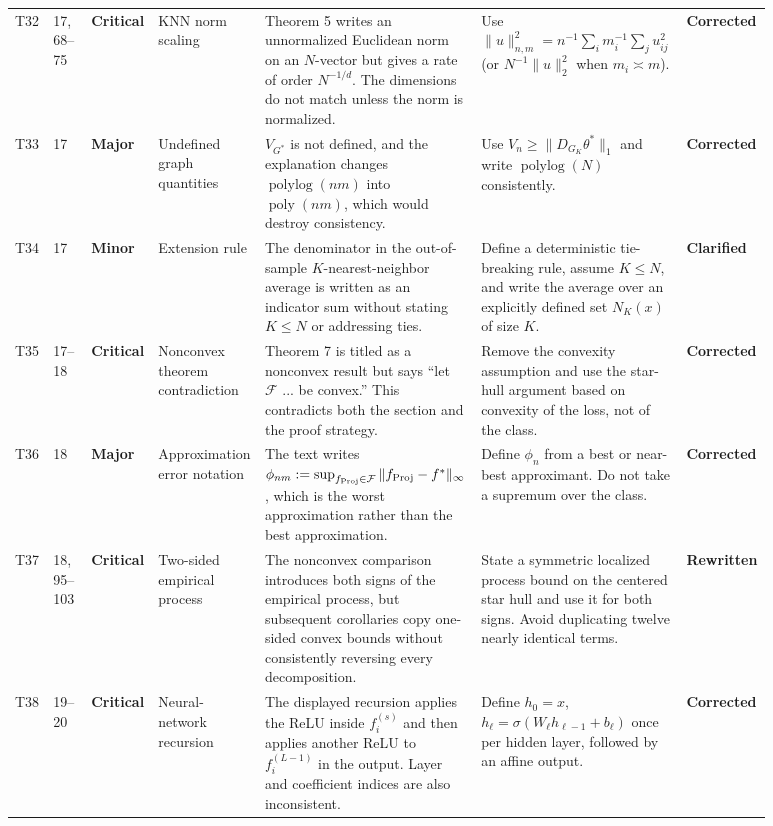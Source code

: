 \documentclass[11pt]{article}
\newcommand{\status}[1]{\textcolor{implgreen}{\textbf{#1}}}
\begin{document}
\begin{landscape}
\begin{longtable}{L{0.04\linewidth}L{0.055\linewidth}L{0.065\linewidth}L{0.11\linewidth}L{0.245\linewidth}L{0.275\linewidth}L{0.095\linewidth}}
T32 & 17, 68--75 & \textcolor{crit}{\textbf{Critical}} & KNN norm scaling & Theorem 5 writes an unnormalized Euclidean norm on an $N$-vector but gives a rate of order $N^{-1/d}$. The dimensions do not match unless the norm is normalized. & Use $\|u\|_{n,m}^2=n^{-1}\sum_i m_i^{-1}\sum_j u_{ij}^2$ (or $N^{-1}\|u\|_2^2$ when $m_i\asymp m$). & \status{Corrected}\\
T33 & 17 & \textcolor{major}{\textbf{Major}} & Undefined graph quantities & $V_{G^*}$ is not defined, and the explanation changes $\operatorname{polylog}(nm)$ into $\operatorname{poly}(nm)$, which would destroy consistency. & Use $V_n\ge\|D_{G_K}\theta^*\|_1$ and write $\operatorname{polylog}(N)$ consistently. & \status{Corrected}\\
T34 & 17 & \textcolor{minor}{\textbf{Minor}} & Extension rule & The denominator in the out-of-sample $K$-nearest-neighbor average is written as an indicator sum without stating $K\le N$ or addressing ties. & Define a deterministic tie-breaking rule, assume $K\le N$, and write the average over an explicitly defined set $N_K(x)$ of size $K$. & \status{Clarified}\\
T35 & 17--18 & \textcolor{crit}{\textbf{Critical}} & Nonconvex theorem contradiction & Theorem 7 is titled as a nonconvex result but says “let $\mathcal F$ ... be convex.” This contradicts both the section and the proof strategy. & Remove the convexity assumption and use the star-hull argument based on convexity of the loss, not of the class. & \status{Corrected}\\
T36 & 18 & \textcolor{major}{\textbf{Major}} & Approximation error notation & The text writes $\phi_{nm}:=\sup_{f_{\rm Proj}\in\mathcal F}\|f_{\rm Proj}-f^*\|_\infty$, which is the worst approximation rather than the best approximation. & Define $\phi_n$ from a best or near-best approximant. Do not take a supremum over the class. & \status{Corrected}\\
T37 & 18, 95--103 & \textcolor{crit}{\textbf{Critical}} & Two-sided empirical process & The nonconvex comparison introduces both signs of the empirical process, but subsequent corollaries copy one-sided convex bounds without consistently reversing every decomposition. & State a symmetric localized process bound on the centered star hull and use it for both signs. Avoid duplicating twelve nearly identical terms. & \status{Rewritten}\\
T38 & 19--20 & \textcolor{crit}{\textbf{Critical}} & Neural-network recursion & The displayed recursion applies the ReLU inside $f_i^{(s)}$ and then applies another ReLU to $f_i^{(L-1)}$ in the output. Layer and coefficient indices are also inconsistent. & Define $h_0=x$, $h_\ell=\sigma(W_\ell h_{\ell-1}+b_\ell)$ once per hidden layer, followed by an affine output. & \status{Corrected}\\

\end{longtable}
\end{landscape}
\end{document}
